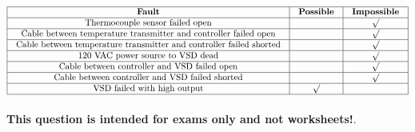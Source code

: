 






$$\vbox{\offinterlineskip
\halign{\strut
\vrule \quad\hfil # \ \hfil & 
\vrule \quad\hfil # \ \hfil & 
\vrule \quad\hfil # \ \hfil \vrule \cr
\noalign{\hrule}
%
{\bf Fault} & {\bf Possible} & {\bf Impossible} \cr
%
\noalign{\hrule}
%
Thermocouple sensor failed open &  & $\surd$ \cr
%
\noalign{\hrule}
%
Cable between temperature transmitter and controller failed open &  & $\surd$ \cr
%
\noalign{\hrule}
%
Cable between temperature transmitter and controller failed shorted &  & $\surd$ \cr
%
\noalign{\hrule}
%
120 VAC power source to VSD dead &  & $\surd$ \cr
%
\noalign{\hrule}
%
Cable between controller and VSD failed open &  & $\surd$ \cr
%
\noalign{\hrule}
%
Cable between controller and VSD failed shorted &  & $\surd$ \cr
%
\noalign{\hrule}
%
VSD failed with high output & $\surd$ &  \cr
%
\noalign{\hrule}
} %
}$$ %








{\bf This question is intended for exams only and not worksheets!}.



